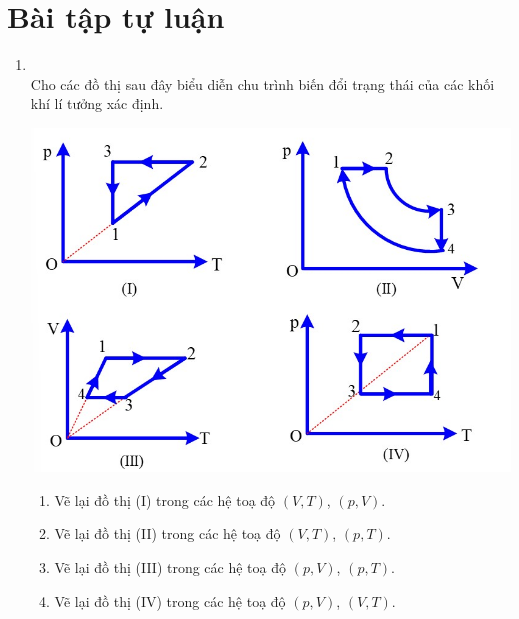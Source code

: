 \section{Bài tập tự luận}
\begin{enumerate}[label=\bfseries Câu \arabic*:, leftmargin=1.7cm]
	\item{}\\
	Cho các đồ thị sau đây biểu diễn chu trình biến đổi trạng thái của các khối khí lí tưởng xác định.
	\begin{center}
		\includegraphics[width=0.65\linewidth]{../figs/VN12-Y24-PH-SYL-014P-10}
	\end{center}
\begin{enumerate}[label=\alph*)]
	\item Vẽ lại đồ thị (I) trong các hệ toạ độ $\left(V, T\right)$, $\left(p, V\right)$.
	\item Vẽ lại đồ thị (II) trong các hệ toạ độ  $\left(V,T\right)$, $\left(p, T\right)$.
	\item Vẽ lại đồ thị (III) trong các hệ toạ độ $\left(p, V\right)$, $\left(p, T\right)$.
	\item Vẽ lại đồ thị (IV) trong các hệ toạ độ $\left(p, V\right)$, $\left(V, T\right)$.
\end{enumerate}
\end{enumerate}
